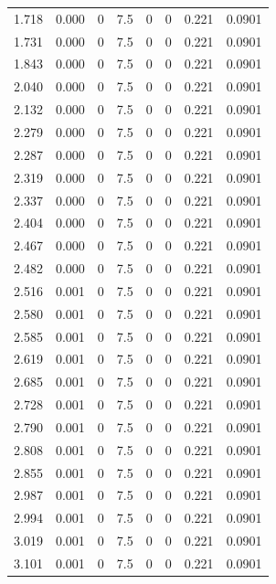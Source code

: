 \documentclass[preview]{standalone}
\begin{document}
{{\begin{tabular}{L{1.2cm}C{1.2cm} C{0.3cm}C{0.5cm} C{1.4cm}C{1.4cm} C{1.4cm}C{1.4cm}}
  1.718  &  0.000  & 0     & 7.5 &  0  & 0  & 0.221 &  0.0901   \\ 
  1.731  &  0.000  & 0     & 7.5 &  0  & 0  & 0.221 &  0.0901   \\ 
  1.843  &  0.000  & 0     & 7.5 &  0  & 0  & 0.221 &  0.0901   \\ 
  2.040  &  0.000  & 0     & 7.5 &  0  & 0  & 0.221 &  0.0901   \\ 
  2.132  &  0.000  & 0     & 7.5 &  0  & 0  & 0.221 &  0.0901   \\ 
  2.279  &  0.000  & 0     & 7.5 &  0  & 0  & 0.221 &  0.0901   \\ 
  2.287  &  0.000  & 0     & 7.5 &  0  & 0  & 0.221 &  0.0901   \\ 
  2.319  &  0.000  & 0     & 7.5 &  0  & 0  & 0.221 &  0.0901   \\ 
  2.337  &  0.000  & 0     & 7.5 &  0  & 0  & 0.221 &  0.0901   \\ 
  2.404  &  0.000  & 0     & 7.5 &  0  & 0  & 0.221 &  0.0901   \\ 
  2.467  &  0.000  & 0     & 7.5 &  0  & 0  & 0.221 &  0.0901   \\ 
  2.482  &  0.000  & 0     & 7.5 &  0  & 0  & 0.221 &  0.0901   \\ 
  2.516  &  0.001  & 0     & 7.5 &  0  & 0  & 0.221 &  0.0901   \\ 
  2.580  &  0.001  & 0     & 7.5 &  0  & 0  & 0.221 &  0.0901   \\ 
  2.585  &  0.001  & 0     & 7.5 &  0  & 0  & 0.221 &  0.0901   \\ 
  2.619  &  0.001  & 0     & 7.5 &  0  & 0  & 0.221 &  0.0901   \\ 
  2.685  &  0.001  & 0     & 7.5 &  0  & 0  & 0.221 &  0.0901   \\ 
  2.728  &  0.001  & 0     & 7.5 &  0  & 0  & 0.221 &  0.0901   \\ 
  2.790  &  0.001  & 0     & 7.5 &  0  & 0  & 0.221 &  0.0901   \\ 
  2.808  &  0.001  & 0     & 7.5 &  0  & 0  & 0.221 &  0.0901   \\ 
  2.855  &  0.001  & 0     & 7.5 &  0  & 0  & 0.221 &  0.0901   \\ 
  2.987  &  0.001  & 0     & 7.5 &  0  & 0  & 0.221 &  0.0901   \\ 
  2.994  &  0.001  & 0     & 7.5 &  0  & 0  & 0.221 &  0.0901   \\ 
  3.019  &  0.001  & 0     & 7.5 &  0  & 0  & 0.221 &  0.0901   \\ 
  3.101  &  0.001  & 0     & 7.5 &  0  & 0  & 0.221 &  0.0901   \\ 
\hline 
\end{tabular} 

}}
\end{document}
